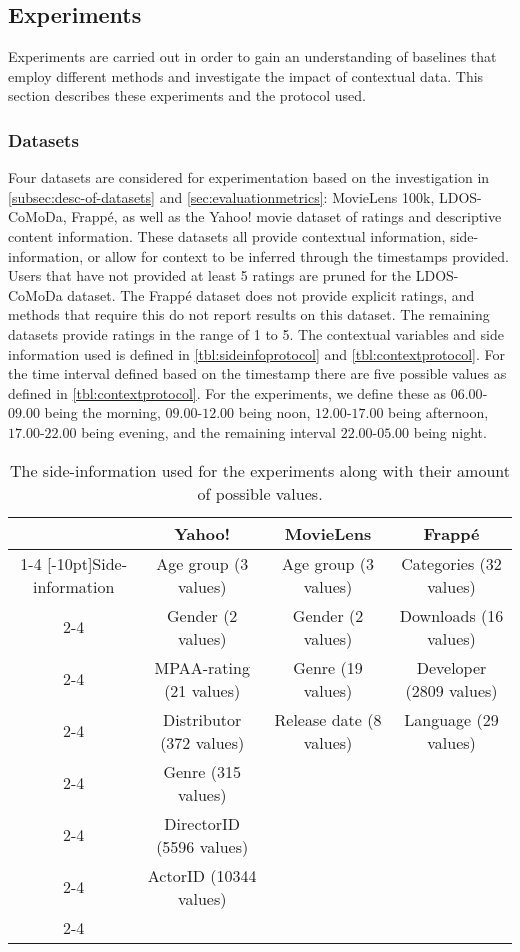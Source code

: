 \subsection{Experiments}\label{subsec:experimentprotocol}
Experiments are carried out in order to gain an understanding of baselines that employ different methods and investigate the impact of contextual data.
This section describes these experiments and the protocol used.

\subsubsection{Datasets}
Four datasets are considered for experimentation based on the investigation in \autoref{subsec:desc-of-datasets} and \autoref{sec:evaluationmetrics}: MovieLens 100k, LDOS-CoMoDa, Frappé, as well as the Yahoo! movie dataset of ratings and descriptive content information\cite{Yahoo!-movie}.
These datasets all provide contextual information, side-information, or allow for context to be inferred through the timestamps provided.
Users that have not provided at least 5 ratings are pruned for the LDOS-CoMoDa dataset.
The Frappé dataset does not provide explicit ratings, and methods that require this do not report results on this dataset.
The remaining datasets provide ratings in the range of 1 to 5.
The contextual variables and side information used is defined in \autoref{tbl:sideinfoprotocol} and \autoref{tbl:contextprotocol}.
For the time interval defined based on the timestamp there are five possible values as defined in \autoref{tbl:contextprotocol}.
For the experiments, we define these as $06.00$-$09.00$ being the morning, $09.00$-$12.00$ being noon, $12.00$-$17.00$ being afternoon, $17.00$-$22.00$ being evening, and the remaining interval $22.00$-$05.00$ being night.
\\
\begin{table*}[]\centering
    \caption{The side-information used for the experiments along with their amount of possible values.}\label{tbl:sideinfoprotocol}
    \scriptsize
    \begin{tabular}{cccc}\toprule
         & \textbf{Yahoo!} & \textbf{MovieLens} & \textbf{Frappé}\\\cmidrule{1-4}
         \multirow{8}{*}[-10pt]{Side-information} & Age group (3 values) & Age group (3 values) & Categories (32 values)\\\cmidrule{2-4}
         & Gender (2 values) & Gender (2 values) & Downloads (16 values) \\\cmidrule{2-4}
         & MPAA-rating (21 values)  &  Genre (19 values) & Developer (2809 values) \\\cmidrule{2-4}
         & Distributor (372 values)  & Release date (8 values) & Language (29 values) \\\cmidrule{2-4}
         & Genre (315 values)  &  &  \\\cmidrule{2-4}
         & DirectorID (5596 values)  &  &  \\\cmidrule{2-4}
         & ActorID (10344 values)  &  &  \\\cmidrule{2-4}
    \bottomrule
    \end{tabular}
\end{table*}

